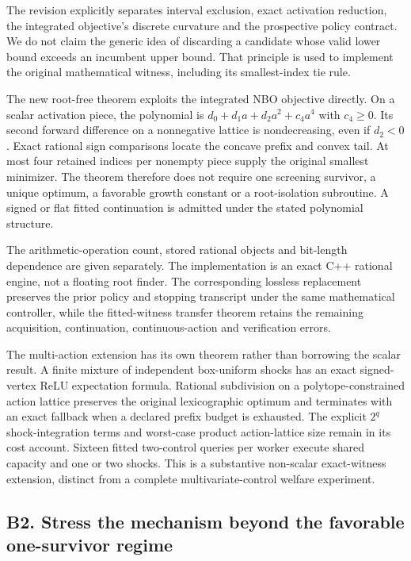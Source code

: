 The revision explicitly separates interval exclusion, exact activation
reduction, the integrated objective's discrete curvature and the
prospective policy contract. We do not claim the generic idea of
discarding a candidate whose valid lower bound exceeds an incumbent
upper bound. That principle is used to implement the original
mathematical witness, including its smallest-index tie rule.

The new root-free theorem exploits the integrated NBO objective
directly. On a scalar activation piece, the polynomial is
\(d_0+d_1a+d_2a^2+c_4a^4\) with \(c_4\ge0\). Its second forward
difference on a nonnegative lattice is nondecreasing, even if \(d_2<0\).
Exact rational sign comparisons locate the concave prefix and convex
tail. At most four retained indices per nonempty piece supply the
original smallest minimizer. The theorem therefore does not require one
screening survivor, a unique optimum, a favorable growth constant or a
root-isolation subroutine. A signed or flat fitted continuation is
admitted under the stated polynomial structure.

The arithmetic-operation count, stored rational objects and bit-length
dependence are given separately. The implementation is an exact C++
rational engine, not a floating root finder. The corresponding lossless
replacement preserves the prior policy and stopping transcript under the
same mathematical controller, while the fitted-witness transfer theorem
retains the remaining acquisition, continuation, continuous-action and
verification errors.

The multi-action extension has its own theorem rather than borrowing the
scalar result. A finite mixture of independent box-uniform shocks has an
exact signed-vertex ReLU expectation formula. Rational subdivision on a
polytope-constrained action lattice preserves the original lexicographic
optimum and terminates with an exact fallback when a declared prefix
budget is exhausted. The explicit \(2^q\) shock-integration terms and
worst-case product action-lattice size remain in its cost account.
Sixteen fitted two-control queries per worker execute shared capacity
and one or two shocks. This is a substantive non-scalar exact-witness
extension, distinct from a complete multivariate-control welfare
experiment.

\hypertarget{b2.-stress-the-mechanism-beyond-the-favorable-one-survivor-regime}{%
\subsection{B2. Stress the mechanism beyond the favorable one-survivor
regime}\label{b2.-stress-the-mechanism-beyond-the-favorable-one-survivor-regime}}

